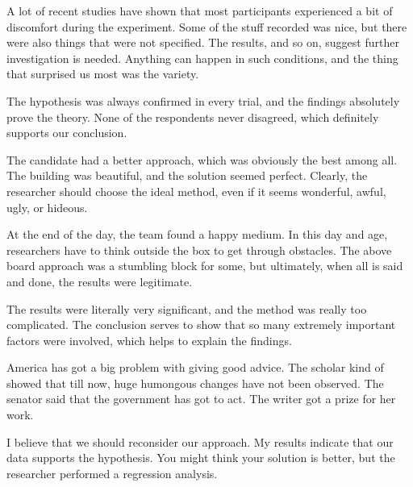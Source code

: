 A lot of recent studies have shown that most participants experienced a bit of discomfort during the experiment. Some of the stuff recorded was nice, but there were also things that were not specified. The results, and so on, suggest further investigation is needed. Anything can happen in such conditions, and the thing that surprised us most was the variety.

The hypothesis was always confirmed in every trial, and the findings absolutely prove the theory. None of the respondents never disagreed, which definitely supports our conclusion.

The candidate had a better approach, which was obviously the best among all. The building was beautiful, and the solution seemed perfect. Clearly, the researcher should choose the ideal method, even if it seems wonderful, awful, ugly, or hideous.

At the end of the day, the team found a happy medium. In this day and age, researchers have to think outside the box to get through obstacles. The above board approach was a stumbling block for some, but ultimately, when all is said and done, the results were legitimate.

The results were literally very significant, and the method was really too complicated. The conclusion serves to show that so many extremely important factors were involved, which helps to explain the findings.

America has got a big problem with giving good advice. The scholar kind of showed that till now, huge humongous changes have not been observed. The senator said that the government has got to act. The writer got a prize for her work.

I believe that we should reconsider our approach. My results indicate that our data supports the hypothesis. You might think your solution is better, but the researcher performed a regression analysis.
